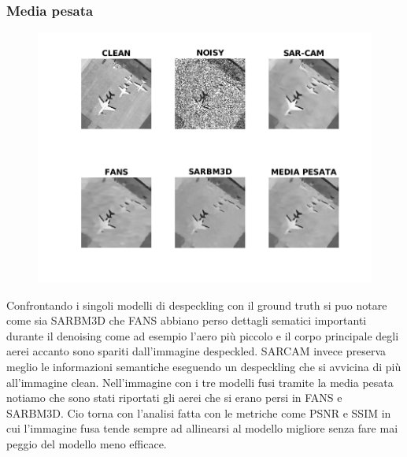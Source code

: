   \subsubsection{Media pesata}
  \begin{figure}[H]
    \centering
    \includegraphics[width=1.1\textwidth]{utils/MPairplane00.png}
    \caption{}
    \label{fig:airplane00MP}
  \end{figure}
Confrontando i singoli modelli di despeckling con il ground truth si puo notare come sia SARBM3D che FANS abbiano 
perso dettagli sematici importanti durante il denoising come ad esempio l'aero più piccolo e il corpo principale degli aerei accanto sono spariti dall'immagine despeckled.
SARCAM invece preserva meglio le informazioni semantiche eseguendo un despeckling che si avvicina di più all'immagine clean.
Nell'immagine con i tre modelli fusi tramite la media pesata notiamo che sono stati riportati gli aerei che si erano persi in FANS e SARBM3D. 
Cio torna con l'analisi fatta con le metriche come PSNR e SSIM in cui l'immagine fusa tende sempre ad allinearsi al modello migliore senza fare mai 
peggio del modello meno efficace.
